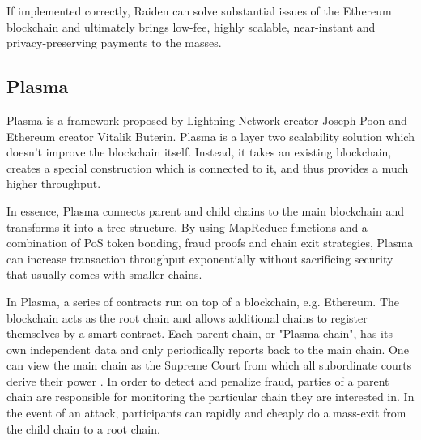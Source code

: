 \noindent
If implemented correctly, Raiden can solve substantial issues of the Ethereum blockchain and ultimately brings low-fee, highly scalable, near-instant and privacy-preserving payments to the masses.

\subsection{Plasma}

Plasma \parencite{Plasma} is a framework proposed by Lightning Network creator Joseph Poon and Ethereum creator Vitalik Buterin. Plasma is a layer two scalability solution which doesn't improve the blockchain itself. Instead, it takes an existing blockchain, creates a special construction which is connected to it, and thus provides a much higher throughput.

In essence, Plasma connects parent and child chains to the main blockchain and transforms it into a tree-structure. By using MapReduce functions and a combination of PoS token bonding, fraud proofs and chain exit strategies, Plasma can increase transaction throughput exponentially without sacrificing security that usually comes with smaller chains.

In Plasma, a series of contracts run on top of a blockchain, e.g. Ethereum. The blockchain acts as the root chain and allows additional chains to register themselves by a smart contract. Each parent chain, or "Plasma chain", has its own independent data and only periodically reports back to the main chain. One can view the main chain as the Supreme Court from which all subordinate courts derive their power \parencites{Plasma10Min}. In order to detect and penalize fraud, parties of a parent chain are responsible for monitoring the particular chain they are interested in. In the event of an attack, participants can rapidly and cheaply do a mass-exit from the child chain to a root chain.

